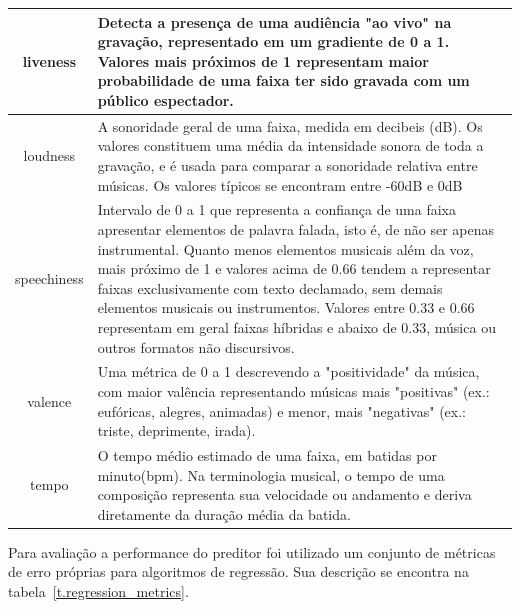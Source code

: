 \begin{tabularx}{\linewidth}{c|X}
	{liveness} & {Detecta a presença de uma audiência "ao vivo" na gravação, representado em um gradiente de 0 a 1. Valores mais próximos de 1 representam maior probabilidade de uma faixa ter sido gravada com um público espectador.}\\\hline
	{loudness} & {A sonoridade geral de uma faixa, medida em decibeis (dB). Os valores constituem uma média da intensidade sonora de toda a gravação, e é usada para comparar a sonoridade relativa entre músicas. Os valores típicos se encontram entre -60dB e 0dB}\\\hline
	{speechiness} & {Intervalo de 0 a 1 que representa a confiança de uma faixa apresentar elementos de palavra falada, isto é, de não ser apenas instrumental. Quanto menos elementos musicais além da voz, mais próximo de 1 e valores acima de 0.66 tendem a representar faixas exclusivamente com texto declamado, sem demais elementos musicais ou instrumentos. Valores entre 0.33 e 0.66 representam em geral faixas híbridas e abaixo de 0.33, música ou outros formatos não discursivos.}\\\hline
	{valence} & {Uma métrica de 0 a 1 descrevendo a "positividade" da música, com maior valência representando músicas mais "positivas" (ex.: eufóricas, alegres, animadas) e menor, mais "negativas" (ex.: triste, deprimente, irada).}\\\hline
	{tempo} & {O tempo médio estimado de uma faixa, em batidas por minuto(bpm). Na terminologia musical, o tempo de uma composição representa sua velocidade ou andamento e deriva diretamente da duração média da batida.}\\\hline
	\bottomrule
	
\end{tabularx}

Para avaliação a performance do preditor foi utilizado um conjunto de métricas de erro próprias para algoritmos de regressão. Sua descrição se encontra na tabela~\ref{t.regression_metrics}.

